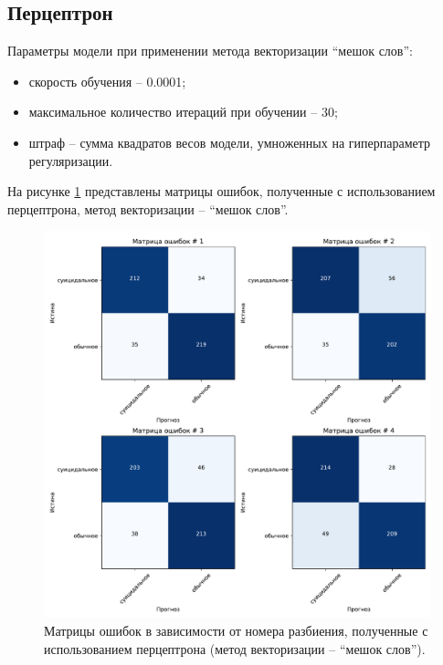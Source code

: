 \subsection{Перцептрон }

Параметры модели при применении метода векторизации ``мешок слов'':
\begin{itemize}
	\item скорость обучения -- 0.0001;
	\item максимальное количество итераций при обучении -- 30;
	\item штраф -- сумма квадратов весов модели, умноженных на гиперпараметр регуляризации.
\end{itemize}

На рисунке \ref{img:perceptronMatrBag} представлены матрицы ошибок, полученные с использованием перцептрона, метод векторизации -- ``мешок слов''.
\begin{figure}[H]
	\centering
	\includegraphics[width=\textwidth]{inc/plots/perceptronMatrBag.pdf}
	\caption{ Матрицы ошибок в зависимости от номера разбиения, полученные с использованием перцептрона (метод векторизации -- ``мешок слов''). }
	\label{img:perceptronMatrBag}
\end{figure}

